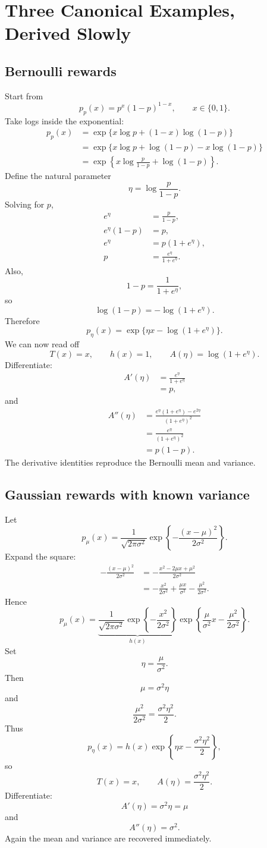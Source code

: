 \documentclass[en,nofont,11pt]{elegantbook}
\begin{document}
\chapter{Three Canonical Examples, Derived Slowly}

\section{Bernoulli rewards}

Start from
\[
p_p(x)=p^x(1-p)^{1-x},
\qquad x\in\{0,1\}.
\]
Take logs inside the exponential:
\begin{align*}
p_p(x)
&=\exp\{x\log p+(1-x)\log(1-p)\}\\
&=\exp\{x\log p+\log(1-p)-x\log(1-p)\}\\
&=\exp\left\{x\log\frac{p}{1-p}+\log(1-p)\right\}.
\end{align*}
Define the natural parameter
\[
\eta=\log\frac{p}{1-p}.
\]
Solving for $p$,
\begin{align*}
e^\eta&=\frac{p}{1-p},\\
e^\eta(1-p)&=p,\\
e^\eta&=p(1+e^\eta),\\
p&=\frac{e^\eta}{1+e^\eta}.
\end{align*}
Also,
\[
1-p=\frac{1}{1+e^\eta},
\]
so
\[
\log(1-p)=-\log(1+e^\eta).
\]
Therefore
\[
p_\eta(x)
=
\exp\{\eta x-\log(1+e^\eta)\}.
\]
We can now read off
\[
T(x)=x,
\qquad
h(x)=1,
\qquad
A(\eta)=\log(1+e^\eta).
\]
Differentiate:
\begin{align*}
A'(\eta)
&=\frac{e^\eta}{1+e^\eta}\\
&=p,
\end{align*}
and
\begin{align*}
A''(\eta)
&=\frac{e^\eta(1+e^\eta)-e^{2\eta}}{(1+e^\eta)^2}\\
&=\frac{e^\eta}{(1+e^\eta)^2}\\
&=p(1-p).
\end{align*}
The derivative identities reproduce the Bernoulli mean and variance.

\section{Gaussian rewards with known variance}

Let
\[
p_\mu(x)
=
\frac{1}{\sqrt{2\pi\sigma^2}}
\exp\left\{-\frac{(x-\mu)^2}{2\sigma^2}\right\}.
\]
Expand the square:
\begin{align*}
-\frac{(x-\mu)^2}{2\sigma^2}
&=-\frac{x^2-2\mu x+\mu^2}{2\sigma^2}\\
&=-\frac{x^2}{2\sigma^2}
+\frac{\mu x}{\sigma^2}
-\frac{\mu^2}{2\sigma^2}.
\end{align*}
Hence
\[
p_\mu(x)
=
\underbrace{\frac{1}{\sqrt{2\pi\sigma^2}}
\exp\left\{-\frac{x^2}{2\sigma^2}\right\}}_{h(x)}
\exp\left\{\frac{\mu}{\sigma^2}x-\frac{\mu^2}{2\sigma^2}\right\}.
\]
Set
\[
\eta=\frac{\mu}{\sigma^2}.
\]
Then
\[
\mu=\sigma^2\eta
\]
and
\[
\frac{\mu^2}{2\sigma^2}
=
\frac{\sigma^2\eta^2}{2}.
\]
Thus
\[
p_\eta(x)
=
h(x)\exp\left\{\eta x-\frac{\sigma^2\eta^2}{2}\right\},
\]
so
\[
T(x)=x,
\qquad
A(\eta)=\frac{\sigma^2\eta^2}{2}.
\]
Differentiate:
\[
A'(\eta)=\sigma^2\eta=\mu
\]
and
\[
A''(\eta)=\sigma^2.
\]
Again the mean and variance are recovered immediately.
\end{document}
